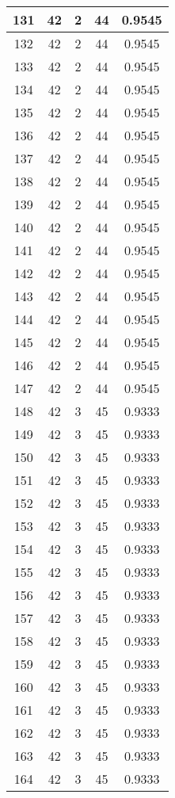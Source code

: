 \documentclass[letterpaper, 12pt]{article}
\begin{document}
\begin{longtable}{|c|c|c|c|c|}
\hline
131 & 42 & 2 & 44 & 0.9545 \\
\hline
132 & 42 & 2 & 44 & 0.9545 \\
\hline
133 & 42 & 2 & 44 & 0.9545 \\
\hline
134 & 42 & 2 & 44 & 0.9545 \\
\hline
135 & 42 & 2 & 44 & 0.9545 \\
\hline
136 & 42 & 2 & 44 & 0.9545 \\
\hline
137 & 42 & 2 & 44 & 0.9545 \\
\hline
138 & 42 & 2 & 44 & 0.9545 \\
\hline
139 & 42 & 2 & 44 & 0.9545 \\
\hline
140 & 42 & 2 & 44 & 0.9545 \\
\hline
141 & 42 & 2 & 44 & 0.9545 \\
\hline
142 & 42 & 2 & 44 & 0.9545 \\
\hline
143 & 42 & 2 & 44 & 0.9545 \\
\hline
144 & 42 & 2 & 44 & 0.9545 \\
\hline
145 & 42 & 2 & 44 & 0.9545 \\
\hline
146 & 42 & 2 & 44 & 0.9545 \\
\hline
147 & 42 & 2 & 44 & 0.9545 \\
\hline
148 & 42 & 3 & 45 & 0.9333 \\
\hline
149 & 42 & 3 & 45 & 0.9333 \\
\hline
150 & 42 & 3 & 45 & 0.9333 \\
\hline
151 & 42 & 3 & 45 & 0.9333 \\
\hline
152 & 42 & 3 & 45 & 0.9333 \\
\hline
153 & 42 & 3 & 45 & 0.9333 \\
\hline
154 & 42 & 3 & 45 & 0.9333 \\
\hline
155 & 42 & 3 & 45 & 0.9333 \\
\hline
156 & 42 & 3 & 45 & 0.9333 \\
\hline
157 & 42 & 3 & 45 & 0.9333 \\
\hline
158 & 42 & 3 & 45 & 0.9333 \\
\hline
159 & 42 & 3 & 45 & 0.9333 \\
\hline
160 & 42 & 3 & 45 & 0.9333 \\
\hline
161 & 42 & 3 & 45 & 0.9333 \\
\hline
162 & 42 & 3 & 45 & 0.9333 \\
\hline
163 & 42 & 3 & 45 & 0.9333 \\
\hline
164 & 42 & 3 & 45 & 0.9333 \\

\end{longtable}
\end{document}
